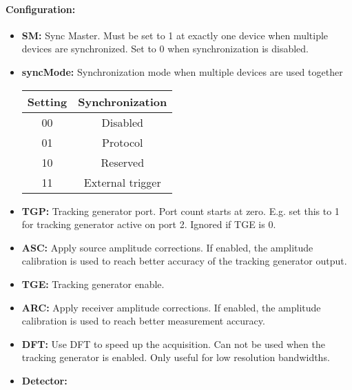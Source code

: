 \documentclass[a4paper,11pt]{article}
\newcommand{\bitrect}[2]{
  \begin{pgfonlayer}{foreground}
    \draw [thick] (0,0) rectangle (#1,1);
    \pgfmathsetmacro\result{#1-1}
    \foreach \x in {1,...,\result}
      \draw [thick] (\x,1) -- (\x, 0.8);
  \end{pgfonlayer}
  \bitlabels{#1}{#2}
}
\newcommand{\rwbits}[3]{
  \draw [thick] (#1,0) rectangle ++(#2,1) node[pos=0.5]{#3};
  \pgfmathsetmacro\start{#1+0.5}
  \pgfmathsetmacro\finish{#1+#2-0.5}
}
\newcommand{\robits}[3]{
  \begin{pgfonlayer}{background}
    \draw [thick, fill=lightgray] (#1,0) rectangle ++(#2,1) node[pos=0.5]{#3};
  \end{pgfonlayer}
  \pgfmathsetmacro\start{#1+0.5}
  \pgfmathsetmacro\finish{#1+#2-0.5}
}
\newcommand{\bitlabels}[2]{
  \foreach \bit in {1,...,#1}{
     \pgfmathsetmacro\result{#2}
     \node [above] at (\bit-0.5, 1) {\pgfmathprintnumber{\result}};
   }
}
\begin{document}
\paragraph{Configuration:}
\begin{center}
\end{center}
\begin{itemize}
\item \textbf{SM:} Sync Master. Must be set to 1 at exactly one device when multiple devices are synchronized. Set to 0 when synchronization is disabled.
\item \textbf{syncMode:} Synchronization mode when multiple devices are used together
\begin{center}
\begin{tabular}{ c|c }
Setting & Synchronization\\
 \hline
00 & Disabled \\
01 & Protocol\\
10 & Reserved\\
11 & External trigger\\
\end{tabular}
\end{center}
\item \textbf{TGP:} Tracking generator port. Port count starts at zero. E.g. set this to 1 for tracking generator active on port 2. Ignored if TGE is 0.
\item \textbf{ASC:} Apply source amplitude corrections. If enabled, the amplitude calibration is used to reach better accuracy of the tracking generator output.
\item \textbf{TGE:} Tracking generator enable.
\item \textbf{ARC:} Apply receiver amplitude corrections. If enabled, the amplitude calibration is used to reach better measurement accuracy.
\item \textbf{DFT:} Use DFT to speed up the acquisition. Can not be used when the tracking generator is enabled. Only useful for low resolution bandwidths.
\item \textbf{Detector:}
\begin{center}
\begin{tabular}{ c|c }

\end{tabular}
\end{center}
\end{itemize}
\end{document}
